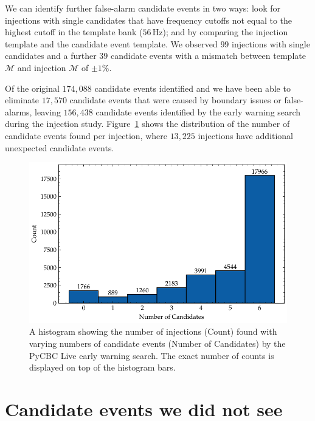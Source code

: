 We can identify further false-alarm candidate events in two ways: look for injections with single candidates that have frequency cutoffs not equal to the highest cutoff in the template bank ($56 \, \text{Hz}$); and by comparing the injection template and the candidate event template. We observed $99$ injections with single candidates and a further $39$ candidate events with a mismatch between template $\mathcal{M}$ and injection $\mathcal{M}$ of ${\pm}1\%$.

Of the original $174,088$ candidate events identified and we have been able to eliminate $17,570$ candidate events that were caused by boundary issues or false-alarms, leaving $156,438$ candidate events identified by the early warning search during the injection study. Figure~\ref{6:fig:cand_hist_all_removed} shows the distribution of the number of candidate events found per injection, where $13,225$ injections have additional unexpected candidate events.
%
\begin{figure}
    \centering
    \includegraphics[width=1.0\linewidth]{images/6_earlywarning/results/count_histogram_all_removed.pdf}
    \caption{A histogram showing the number of injections (Count) found with varying numbers of candidate events (Number of Candidates) by the PyCBC Live early warning search. The exact number of counts is displayed on top of the histogram bars.}
    \label{6:fig:cand_hist_all_removed}
\end{figure}

\section{\label{6:sec:outside-coinc-window}Candidate events we did not see}


